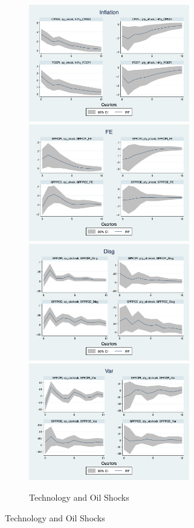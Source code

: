 \documentclass[12pt]{article}
\begin{document}
		\begin{figure}[p]
		\begin{subfigure}[b]{0.5\textwidth}
			\centering
			\caption{Technology and Oil Shocks}
			\includegraphics[width=7cm]{figures/Inf_ashocks_nmp.png}  
			\smallskip
			\includegraphics[width=7cm]{figures/SPFFE_ashocks_nmp.png} 
			\smallskip 
			\includegraphics[width=7cm]{figures/SPFDisg_ab_ashocks_nmp.png} 
			\smallskip 
			\includegraphics[width=7cm]{figures/SPFVar_ab_ashocks_nmp.png} 
		\end{subfigure}

\end{figure}
\end{document}
